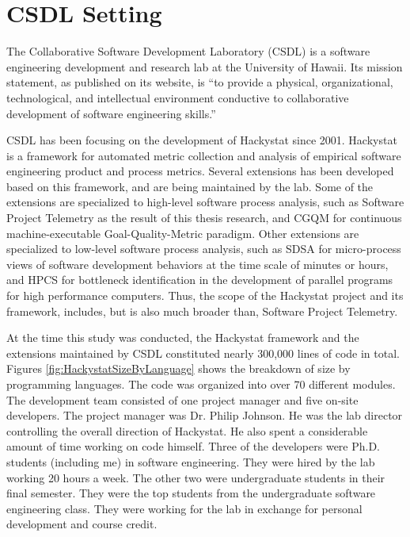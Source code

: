 
\section{CSDL Setting}  \label{EvaluationInCSDL:Setting}

The Collaborative Software Development Laboratory (CSDL) is a software engineering development and research lab at the University of Hawaii. Its mission statement, as published on its website, is ``to provide a physical, organizational, technological, and intellectual environment conductive to collaborative development of software engineering skills.'' 

CSDL has been focusing on the development of Hackystat since 2001. Hackystat is a framework for automated metric collection and analysis of empirical software engineering product and process metrics. Several extensions has been developed based on this framework, and are being maintained by the lab. Some of the extensions are specialized to high-level software process analysis, such as Software Project Telemetry as the result of this thesis research, and CGQM for continuous machine-executable Goal-Quality-Metric paradigm. Other extensions are specialized to low-level software process analysis, such as SDSA for micro-process views of software development behaviors at the time scale of minutes or hours, and HPCS for bottleneck identification in the development of parallel programs for high performance computers.
Thus, the scope of the Hackystat project and its framework, includes, but is also much broader than, Software Project Telemetry.


At the time this study was conducted, the Hackystat framework and the extensions maintained by CSDL constituted nearly 300,000 lines of code in total. Figures \ref{fig:HackystatSizeByLanguage} shows the breakdown of size by programming languages. The code was organized into over 70 different modules. 
The development team consisted of one project manager and five on-site developers. The project manager was Dr. Philip Johnson. He was the lab director controlling the overall direction of Hackystat. He also spent a considerable amount of time working on code himself. Three of the developers were Ph.D. students (including me) in software engineering. They were hired by the lab working 20 hours a week. The other two were undergraduate students in their final semester. They were the top students from the undergraduate software engineering class. They were working for the lab in exchange for personal development and course credit.

